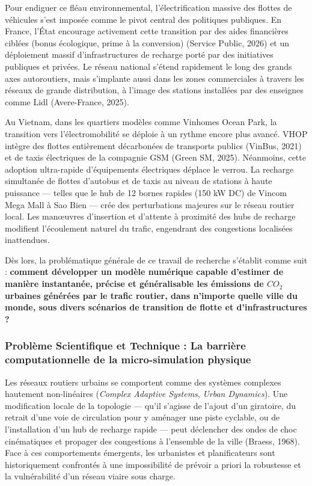 \documentclass[10pt, a4paper]{article}
\begin{document}
Pour endiguer ce fléau environnemental, l'électrification massive des
flottes de véhicules s'est imposée comme le pivot central des politiques
publiques. En France, l'État encourage activement cette transition par
des aides financières ciblées (bonus écologique, prime à la conversion)
(Service Public, 2026) et un déploiement massif d'infrastructures de
recharge porté par des initiatives publiques et privées. Le réseau
national s'étend rapidement le long des grands axes autoroutiers, mais
s'implante aussi dans les zones commerciales à travers les réseaux de
grande distribution, à l'image des stations installées par des enseignes
comme Lidl (Avere-France, 2025).

Au Vietnam, dans les quartiers modèles comme Vinhomes Ocean Park, la
transition vers l'électromobilité se déploie à un rythme encore plus
avancé. VHOP intègre des flottes entièrement décarbonées de transports
publics (VinBus, 2021) et de taxis électriques de la compagnie GSM
(Green SM, 2025). Néanmoins, cette adoption ultra-rapide d'équipements
électriques déplace le verrou. La recharge simultanée de flottes
d'autobus et de taxis au niveau de stations à haute puissance --- telles
que le hub de 12 bornes rapides (150 kW DC) de Vincom Mega Mall à Sao
Bien --- crée des perturbations majeures sur le réseau routier local.
Les manœuvres d'insertion et d'attente à proximité des hubs de recharge
modifient l'écoulement naturel du trafic, engendrant des congestions
localisées inattendues.

Dès lors, la problématique générale de ce travail de recherche s'établit
comme suit : \textbf{comment développer un modèle numérique capable
d'estimer de manière instantanée, précise et généralisable les émissions
de \(CO_2\) urbaines générées par le trafic routier, dans n'importe
quelle ville du monde, sous divers scénarios de transition de flotte et
d'infrastructures ?}

\subsubsection{Problème Scientifique et Technique : La barrière
computationnelle de la micro-simulation
physique}\label{probluxe8me-scientifique-et-technique-la-barriuxe8re-computationnelle-de-la-micro-simulation-physique}

Les réseaux routiers urbains se comportent comme des systèmes complexes
hautement non-linéaires (\emph{Complex Adaptive Systems}, \emph{Urban
Dynamics}). Une modification locale de la topologie --- qu'il s'agisse
de l'ajout d'un giratoire, du retrait d'une voie de circulation pour y
aménager une piste cyclable, ou de l'installation d'un hub de recharge
rapide --- peut déclencher des ondes de choc cinématiques et propager
des congestions à l'ensemble de la ville (Braess, 1968). Face à ces
comportements émergents, les urbanistes et planificateurs sont
historiquement confrontés à une impossibilité de prévoir a priori la
robustesse et la vulnérabilité d'un réseau viaire sous charge.
\end{document}
